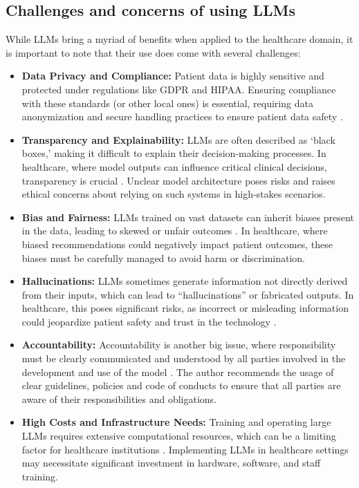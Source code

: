 \subsection{Challenges and concerns of using LLMs}

While LLMs bring a myriad of benefits when applied to the healthcare domain, it is important to note that their use does come with several challenges:

\begin{itemize}
    \item \textbf{Data Privacy and Compliance:} Patient data is highly sensitive and protected under regulations like GDPR and HIPAA. Ensuring compliance with these standards (or other local ones) is essential, requiring data anonymization and secure handling practices to ensure patient data safety \parencite{llm_healthcare,llm_healthcare2,llm_healthcare4}.
    \item \textbf{Transparency and Explainability:} LLMs are often described as ‘black boxes,’ making it difficult to explain their decision-making processes. In healthcare, where model outputs can influence critical clinical decisions, transparency is crucial \parencite{llm_healthcare,llm_healthcare2,llm_healthcare4}. Unclear model architecture poses risks and raises ethical concerns about relying on such systems in high-stakes scenarios.
    \item \textbf{Bias and Fairness:} LLMs trained on vast datasets can inherit biases present in the data, leading to skewed or unfair outcomes \parencite{llm_healthcare2}. In healthcare, where biased recommendations could negatively impact patient outcomes, these biases must be carefully managed to avoid harm or discrimination.
    \item \textbf{Hallucinations:} LLMs sometimes generate information not directly derived from their inputs, which can lead to “hallucinations” or fabricated outputs. In healthcare, this poses significant risks, as incorrect or misleading information could jeopardize patient safety and trust in the technology \parencite{llm_healthcare4,llm_healthcare}.
    \item \textbf{Accountability:} Accountability is another big issue, where responsibility must be clearly communicated and understood by all parties involved in the development and use of the model \parencite{llm_healthcare2}. The author recommends the usage of clear guidelines, policies and code of conducts to ensure that all parties are aware of their responsibilities and obligations.
    \item \textbf{High Costs and Infrastructure Needs:} Training and operating large LLMs requires extensive computational resources, which can be a limiting factor for healthcare institutions \parencite{llm_healthcare4}. Implementing LLMs in healthcare settings may necessitate significant investment in hardware, software, and staff training.
\end{itemize}

